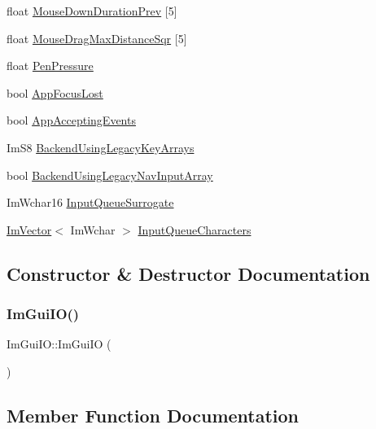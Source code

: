\begin{DoxyCompactItemize}
\item 
float \hyperlink{structImGuiIO_a59d19cf7ad831e57ce15f90295871881}{Mouse\+Down\+Duration\+Prev} \mbox{[}5\mbox{]}
\item 
float \hyperlink{structImGuiIO_a86c7fe77349fd82a60ab7a279aa27f01}{Mouse\+Drag\+Max\+Distance\+Sqr} \mbox{[}5\mbox{]}
\item 
float \hyperlink{structImGuiIO_adb663a185ac88f81cad4ece4d67beea5}{Pen\+Pressure}
\item 
bool \hyperlink{structImGuiIO_a6f907c3044fe77b706f48ee6d7eaa1b2}{App\+Focus\+Lost}
\item 
bool \hyperlink{structImGuiIO_aadb8a762b7a874e9d1f47230a5d62239}{App\+Accepting\+Events}
\item 
Im\+S8 \hyperlink{structImGuiIO_a71d9fa7f004072892216d3504163cd12}{Backend\+Using\+Legacy\+Key\+Arrays}
\item 
bool \hyperlink{structImGuiIO_aa9a50114735531c89671b9c591bf1f3b}{Backend\+Using\+Legacy\+Nav\+Input\+Array}
\item 
Im\+Wchar16 \hyperlink{structImGuiIO_a4740dc94f803920e809747d2c602d571}{Input\+Queue\+Surrogate}
\item 
\hyperlink{structImVector}{Im\+Vector}$<$ Im\+Wchar $>$ \hyperlink{structImGuiIO_a4d9fb1151f10f1f6f7597bb3a21e1447}{Input\+Queue\+Characters}
\end{DoxyCompactItemize}


\subsection{Constructor \& Destructor Documentation}
\mbox{\label{structImGuiIO_a0ad8d993e50108b81b0d279d2d43f69d}} 
\subsubsection{\texorpdfstring{Im\+Gui\+I\+O()}{ImGuiIO()}}
{\footnotesize\ttfamily Im\+Gui\+I\+O\+::\+Im\+Gui\+IO (\begin{DoxyParamCaption}{ }\end{DoxyParamCaption})}



\subsection{Member Function Documentation}
\mbox{\label{structImGuiIO_a051243815ff6305cdcd3db8f84c2dfef}} 
